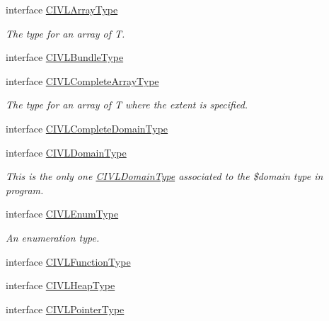 \begin{DoxyCompactItemize}
\item 
interface \hyperlink{interfaceedu_1_1udel_1_1cis_1_1vsl_1_1civl_1_1model_1_1IF_1_1type_1_1CIVLArrayType}{C\+I\+V\+L\+Array\+Type}
\begin{DoxyCompactList}\small\item\em The type for an array of T. \end{DoxyCompactList}\item 
interface \hyperlink{interfaceedu_1_1udel_1_1cis_1_1vsl_1_1civl_1_1model_1_1IF_1_1type_1_1CIVLBundleType}{C\+I\+V\+L\+Bundle\+Type}
\item 
interface \hyperlink{interfaceedu_1_1udel_1_1cis_1_1vsl_1_1civl_1_1model_1_1IF_1_1type_1_1CIVLCompleteArrayType}{C\+I\+V\+L\+Complete\+Array\+Type}
\begin{DoxyCompactList}\small\item\em The type for an array of T where the extent is specified. \end{DoxyCompactList}\item 
interface \hyperlink{interfaceedu_1_1udel_1_1cis_1_1vsl_1_1civl_1_1model_1_1IF_1_1type_1_1CIVLCompleteDomainType}{C\+I\+V\+L\+Complete\+Domain\+Type}
\item 
interface \hyperlink{interfaceedu_1_1udel_1_1cis_1_1vsl_1_1civl_1_1model_1_1IF_1_1type_1_1CIVLDomainType}{C\+I\+V\+L\+Domain\+Type}
\begin{DoxyCompactList}\small\item\em This is the only one \hyperlink{interfaceedu_1_1udel_1_1cis_1_1vsl_1_1civl_1_1model_1_1IF_1_1type_1_1CIVLDomainType}{C\+I\+V\+L\+Domain\+Type} associated to the \$domain type in program. \end{DoxyCompactList}\item 
interface \hyperlink{interfaceedu_1_1udel_1_1cis_1_1vsl_1_1civl_1_1model_1_1IF_1_1type_1_1CIVLEnumType}{C\+I\+V\+L\+Enum\+Type}
\begin{DoxyCompactList}\small\item\em An enumeration type. \end{DoxyCompactList}\item 
interface \hyperlink{interfaceedu_1_1udel_1_1cis_1_1vsl_1_1civl_1_1model_1_1IF_1_1type_1_1CIVLFunctionType}{C\+I\+V\+L\+Function\+Type}
\item 
interface \hyperlink{interfaceedu_1_1udel_1_1cis_1_1vsl_1_1civl_1_1model_1_1IF_1_1type_1_1CIVLHeapType}{C\+I\+V\+L\+Heap\+Type}
\item 
interface \hyperlink{interfaceedu_1_1udel_1_1cis_1_1vsl_1_1civl_1_1model_1_1IF_1_1type_1_1CIVLPointerType}{C\+I\+V\+L\+Pointer\+Type}

\end{DoxyCompactItemize}
